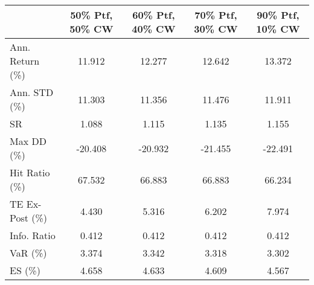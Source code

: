 \begin{tabular}{lcccc}
\toprule
{} &  50\% Ptf, 50\% CW &  60\% Ptf, 40\% CW &  70\% Ptf, 30\% CW &  90\% Ptf, 10\% CW \\
\midrule
Ann. Return (\%) &           11.912 &           12.277 &           12.642 &           13.372 \\
Ann. STD (\%)    &           11.303 &           11.356 &           11.476 &           11.911 \\
SR              &            1.088 &            1.115 &            1.135 &            1.155 \\
Max DD (\%)      &          -20.408 &          -20.932 &          -21.455 &          -22.491 \\
Hit Ratio (\%)   &           67.532 &           66.883 &           66.883 &           66.234 \\
TE Ex-Post (\%)  &            4.430 &            5.316 &            6.202 &            7.974 \\
Info. Ratio     &            0.412 &            0.412 &            0.412 &            0.412 \\
VaR (\%)         &            3.374 &            3.342 &            3.318 &            3.302 \\
ES (\%)          &            4.658 &            4.633 &            4.609 &            4.567 \\
\bottomrule
\end{tabular}
